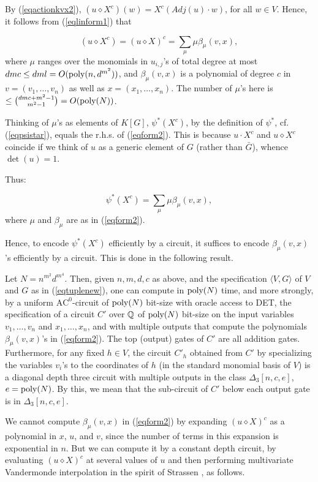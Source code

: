 \documentclass[11pt]{article}
\begin{document}
By (\ref{eqactionkvx2}), $(u \diamond  X^c)(w)= X^c(Adj(u) \cdot  w)$, for all $w \in V$. Hence, it follows
from (\ref{eqlinform1}) that

\begin{equation}  \label{eqform2}
(u \diamond  X^c) = (u \diamond  X)^c = \sum_{\mu}   \mu \beta_\mu(v, x), 
\end{equation}
where $\mu$ ranges over the  monomials  in $u_{i,j}$'s 
of total degree at most 
$d m c \le d m l = O({\mbox {poly}}(n,d^{m^2}))$,  and 
$\beta_\mu(v, x)$ is a polynomial of degree $c$ in $v=(v_1,\ldots,v_n)$ as well as  $x=(x_1,\ldots,x_n)$.
The number of $\mu$'s here  is  $\le {d m c + m^2 -1 \choose m^2 -1}= O({\mbox {poly}}(N))$.

Thinking of  $\mu$'s 
as elements of $K[G]$,  $\psi^*(X^c)$, by the definition of $\psi^*$, cf. (\ref{eqpsistar}), 
equals  the r.h.s. of (\ref{eqform2}). This is because
$u \cdot X^c$ and $u \diamond X^c$ coincide  if we think of  $u$ as a generic
element of $G$ (rather than $\bar G$), whence $\det(u)=1$.

Thus:

\begin{equation}  \label{eqform3}
\psi^*(X^c) =  \sum_{\mu}   \mu \beta_\mu(v, x), 
\end{equation}
where $\mu$ and $\beta_\mu$ are as in (\ref{eqform2}).

Hence, to encode $\psi^*(X^c)$ efficiently 
by a circuit, it suffices to encode $\beta_\mu(v,x)$'s efficiently 
by a circuit. This is done in the following result.

\begin{lemma} \label{lC'}
Let $N=n^{m^2} d^{m^4}$. Then, given $n,m,d,c$ as above, and the specification $\langle V, G \rangle$ of $V$ and $G$  as in 
(\ref{eqtuplenew}), 
one can compute in ${\mbox {poly}}(N)$ time, and more strongly, by a uniform $\mbox{AC}^0$-circuit 
of ${\mbox {poly}}(N)$ bit-size with oracle access to DET, the
specification of a circuit $C'$ over $\mathbb{Q}$ of ${\mbox {poly}}(N)$ bit-size
on the  input variables $v_1,\ldots,v_n$ and $x_1,\ldots,x_n$,  and with multiple outputs 
that compute  the polynomials $\beta_\mu(v, x)$'s in (\ref{eqform2}).
The top (output) gates of $C'$ are all addition gates. Furthermore, for any fixed $h \in V$, 
the circuit $C'_h$ obtained from $C'$ by specializing the variables $v_i$'s to 
the coordinates  of $h$ (in the standard monomial basis of $V$) is a diagonal depth three circuit with multiple outputs in the class 
$\Delta_3[n,c,e]$, $e={\mbox {poly}}(N)$. By this, we mean that the sub-circuit of $C'$ 
below  each output gate is in $\Delta_3[n,c,e]$.
\end{lemma}
\proof 
We cannot compute $\beta_\mu(v, x)$ in (\ref{eqform2}) by expanding $(u \diamond  X)^c$ 
as a polynomial in $x$, $u$, and $v$, 
since the number of terms in this expansion is exponential in $n$. 
But we can compute it  by a constant depth  circuit,
by evaluating $(u \diamond  X)^c$ at several values of $u$ and then performing 
multivariate Vandermonde interpolation in the spirit of Strassen \cite{strassen,yehu},  as follows.
\end{document}
